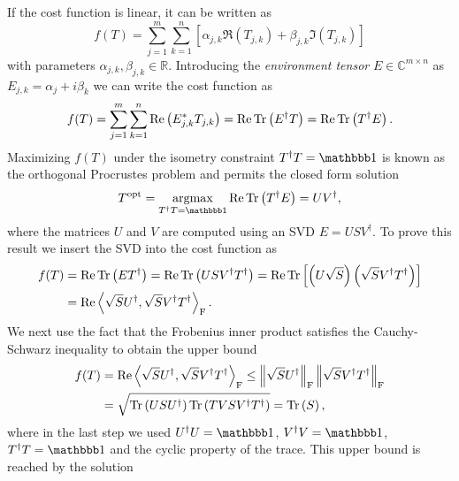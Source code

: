 If the cost function is linear, it can be written as
\begin{equation}
	f(T) = \sum_{j=1}^{m}\sum_{k=1}^{n}\left[\alpha_{j,k}\Re\left(T_{j,k}\right) + \beta_{j,k} \Im\left(T_{j,k}\right)\right]
\end{equation}
with parameters $\alpha_{j,k}, \beta_{j,k} \in \mathbb{R}$. Introducing the \textit{environment tensor} $E\in\mathbb{C}^{m\times n}$ as $E_{j,k} = \alpha_j + i \beta_k$ we can write the cost function as
\begin{equation}
	f(T) = \sum_{j=1}^{m}\sum_{k=1}^{n} \operatorname{Re}\left(E_{j,k}^*T_{j,k}\right) = \operatorname{Re}\operatorname{Tr}\left(E^\dagger T\right) = \operatorname{Re}\operatorname{Tr}\left(T^\dagger E\right).
\end{equation}
Maximizing $f(T)$ under the isometry constraint $T^\dagger T = \id$ is known as the orthogonal Procrustes problem and permits the closed form solution
\begin{equation}
	\label{eq:orthogonal_procrustes_problem_closed_form_solution}
	T^\text{opt} = \underset{T^\dagger T = \id}{\argmax} \Re\Tr\left(T^\dagger E\right) = UV^\dagger,
\end{equation}
where the matrices $U$ and $V$ are computed using an SVD $E = USV^\dagger$. To prove this result we insert the SVD into the cost function as
\begin{equation}
	\begin{split}
	f(T) &= \operatorname{Re}\operatorname{Tr}\left(ET^\dagger\right) = \operatorname{Re}\operatorname{Tr}\left(USV^\dagger T^\dagger\right) = \operatorname{Re}\operatorname{Tr}\left[\left(U\sqrt{S}\right)\left(\sqrt{S}V^\dagger T^\dagger\right)\right] \\
	&= \operatorname{Re}\left\langle\sqrt{S}U^\dagger,\sqrt{S}V^\dagger T^\dagger\right\rangle_\text{F}.
	\end{split}
\end{equation}
We next use the fact that the Frobenius inner product satisfies the Cauchy-Schwarz inequality to obtain the upper bound
\begin{equation}
	\begin{split}
		f(T) &= \operatorname{Re}\left\langle\sqrt{S}U^\dagger,\sqrt{S}V^\dagger T^\dagger\right\rangle_\text{F} \le \left\lVert\sqrt{S}U^\dagger\right\rVert_\text{F}\left\lVert\sqrt{S}V^\dagger T^\dagger\right\rVert_\text{F} \\
		&= \sqrt{\operatorname{Tr}\left(USU^\dagger\right)\operatorname{Tr}\left(TVSV^\dagger T^\dagger\right)} = \operatorname{Tr}\left(S\right),
	\end{split}
\end{equation}
where in the last step we used $U^\dagger U = \id$, $V^\dagger V = \id$, $T^\dagger T = \id$ and the cyclic property of the trace. This upper bound is reached by the solution
